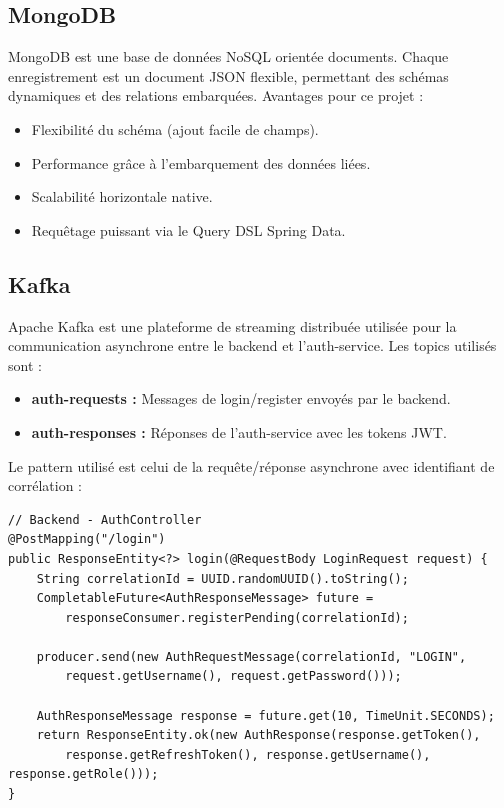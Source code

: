 \documentclass[12pt,a4paper,twoside]{report}
\begin{document}
\subsection{MongoDB}
MongoDB est une base de données NoSQL orientée documents. Chaque enregistrement est un document JSON flexible, permettant des schémas dynamiques et des relations embarquées. Avantages pour ce projet :
\begin{itemize}[leftmargin=*]
  \item Flexibilité du schéma (ajout facile de champs).
  \item Performance grâce à l'embarquement des données liées.
  \item Scalabilité horizontale native.
  \item Requêtage puissant via le Query DSL Spring Data.
\end{itemize}

\subsection{Kafka}
Apache Kafka est une plateforme de streaming distribuée utilisée pour la communication asynchrone entre le backend et l'auth-service. Les topics utilisés sont :
\begin{itemize}[leftmargin=*]
  \item \textbf{auth-requests :} Messages de login/register envoyés par le backend.
  \item \textbf{auth-responses :} Réponses de l'auth-service avec les tokens JWT.
\end{itemize}

Le pattern utilisé est celui de la requête/réponse asynchrone avec identifiant de corrélation :

\begin{lstlisting}[style=javaStyle, caption=Communication Kafka asynchrone]
// Backend - AuthController
@PostMapping("/login")
public ResponseEntity<?> login(@RequestBody LoginRequest request) {
    String correlationId = UUID.randomUUID().toString();
    CompletableFuture<AuthResponseMessage> future = 
        responseConsumer.registerPending(correlationId);

    producer.send(new AuthRequestMessage(correlationId, "LOGIN", 
        request.getUsername(), request.getPassword()));

    AuthResponseMessage response = future.get(10, TimeUnit.SECONDS);
    return ResponseEntity.ok(new AuthResponse(response.getToken(), 
        response.getRefreshToken(), response.getUsername(), response.getRole()));
}
\end{lstlisting}
\end{document}
